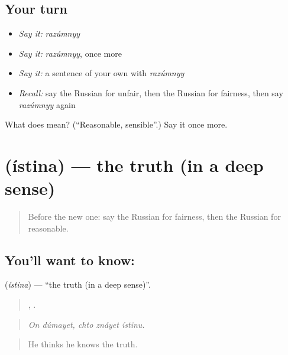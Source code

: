 \subsection*{Your turn}
\begin{itemize}
\raggedright
  \item \emph{Say it:} \emph{razúmnyy}
  \item \emph{Say it:} \emph{razúmnyy}, once more
  \item \emph{Say it:} a sentence of your own with \emph{razúmnyy}
  \item \emph{Recall:} say the Russian for unfair, then the Russian for fairness, then say \emph{razúmnyy} again
\end{itemize}

\begin{tcolorbox}[breakable,colback=teal!4,colframe=teal!35!black,title={Before you move on}]
What does  mean? (\textquotedblleft{}Reasonable, sensible\textquotedblright{}.) Say it once more.
\end{tcolorbox}
\section[\texorpdfstring{\ru{истина} (ístina)}{истина (ístina)}]{ (ístina) — the truth (in a deep sense)}

\label{lesson:RU-C345-istina}



\begin{quote}
Before the new one: say the Russian for fairness, then the Russian for reasonable.
\end{quote}

\subsection*{You'll want to know: }
\textbf{} (\emph{ístina}) — \textquotedblleft{}the truth (in a deep sense)\textquotedblright{}.

\begin{quote}
 ,   .
\end{quote}

\begin{quote}
\emph{On dúmayet, chto znáyet ístinu.}
\end{quote}

\begin{quote}
He thinks he knows the truth.
\end{quote}

